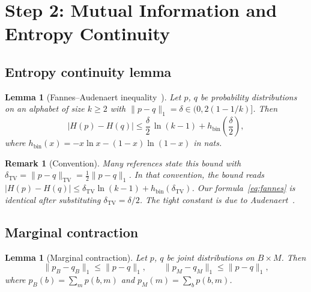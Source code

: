 \documentclass[11pt,a4paper]{article}
\newtheorem{lemma}[theorem]{Lemma}
\newtheorem{remark}[theorem]{Remark}
\begin{document}
\section{Step 2: Mutual Information and Entropy Continuity}\label{sec:step2}

\subsection{Entropy continuity lemma}

\begin{lemma}[Fannes--Audenaert inequality~\cite{CsiszarKorner2011,Audenaert2007}]
\label{lem:entropy-cont}
Let $p$, $q$ be probability distributions on an alphabet of size $k \ge 2$
with $\|p - q\|_1 = \delta \in (0, 2(1 - 1/k)]$.  Then
\begin{equation}\label{eq:fannes}
  |H(p) - H(q)| \le \frac{\delta}{2}\,\ln(k-1)
  + h_{\mathrm{bin}}\!\left(\frac{\delta}{2}\right),
\end{equation}
where $h_{\mathrm{bin}}(x) = -x\ln x - (1-x)\ln(1-x)$ in nats.
\end{lemma}

\begin{remark}[Convention]\label{rem:convention}
Many references state this bound with $\delta_{\mathrm{TV}} = \|p-q\|_{\mathrm{TV}}
= \frac{1}{2}\|p-q\|_1$.  In that convention, the bound reads
$|H(p) - H(q)| \le \delta_{\mathrm{TV}}\ln(k-1) + h_{\mathrm{bin}}(\delta_{\mathrm{TV}})$.
Our formula~\eqref{eq:fannes} is identical after substituting
$\delta_{\mathrm{TV}} = \delta/2$.
The tight constant is due to Audenaert~\cite{Audenaert2007}.
\end{remark}

\subsection{Marginal contraction}

\begin{lemma}[Marginal contraction]\label{lem:marginal}
Let $p$, $q$ be joint distributions on $B \times M$.  Then
\begin{equation}\label{eq:marginal-contract}
  \|p_B - q_B\|_1 \le \|p - q\|_1,
  \qquad
  \|p_M - q_M\|_1 \le \|p - q\|_1,
\end{equation}
where $p_B(b) = \sum_m p(b,m)$ and $p_M(m) = \sum_b p(b,m)$.
\end{lemma}
\end{document}
